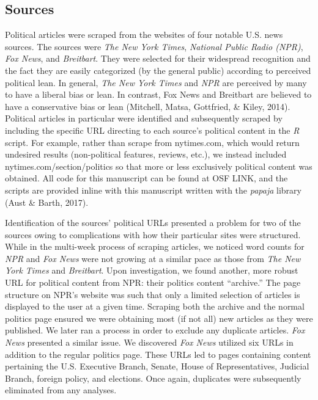 \documentclass[,man]{apa6}
\begin{document}
\hypertarget{sources}{%
\subsection{Sources}\label{sources}}

Political articles were scraped from the websites of four notable U.S. news sources. The sources were \emph{The New York Times}, \emph{National Public Radio (NPR)}, \emph{Fox News}, and \emph{Breitbart}. They were selected for their widespread recognition and the fact they are easily categorized (by the general public) according to perceived political lean. In general, \emph{The New York Times} and \emph{NPR} are perceived by many to have a liberal bias or lean. In contrast, Fox News and Breitbart are believed to have a conservative bias or lean (Mitchell, Matsa, Gottfried, \& Kiley, 2014). Political articles in particular were identified and subsequently scraped by including the specific URL directing to each source's political content in the \emph{R} script. For example, rather than scrape from nytimes.com, which would return undesired results (non-political features, reviews, etc.), we instead included nytimes.com/section/politics so that more or less exclusively political content was obtained. All code for this manuscript can be found at OSF LINK, and the scripts are provided inline with this manuscript written with the \emph{papaja} library (Aust \& Barth, 2017).

Identification of the sources' political URLs presented a problem for two of the sources owing to complications with how their particular sites were structured. While in the multi-week process of scraping articles, we noticed word counts for \emph{NPR} and \emph{Fox News} were not growing at a similar pace as those from \emph{The New York Times} and \emph{Breitbart}. Upon investigation, we found another, more robust URL for political content from NPR: their politics content \enquote{archive.} The page structure on NPR's website was such that only a limited selection of articles is displayed to the user at a given time. Scraping both the archive and the normal politics page ensured we were obtaining most (if not all) new articles as they were published. We later ran a process in order to exclude any duplicate articles. \emph{Fox News} presented a similar issue. We discovered \emph{Fox News} utilized six URLs in addition to the regular politics page. These URLs led to pages containing content pertaining the U.S. Executive Branch, Senate, House of Representatives, Judicial Branch, foreign policy, and elections. Once again, duplicates were subsequently eliminated from any analyses.
\end{document}
